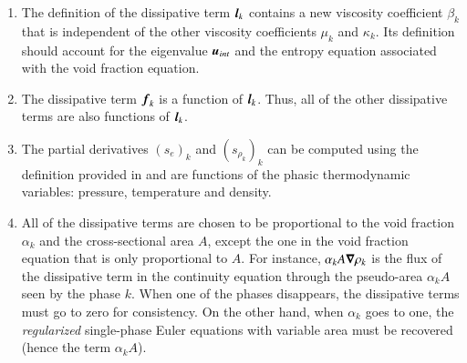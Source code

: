 \documentclass[preprint,10pt]{elsarticle}
\begin{document}
\begin{enumerate}
\item {The definition of the dissipative term $\boldsymbol l_k$ contains a new viscosity
    coefficient $\beta_k$ that is independent of
    the other viscosity coefficients $\mu_k$ and $\kappa_k$. Its definition should
    account for the eigenvalue $\boldsymbol u_{int}$ and  the entropy equation associated with the void fraction equation.}

\item {The dissipative term $\boldsymbol f_k$ is a function of $\boldsymbol l_k$. Thus, all of the other
    dissipative terms are also functions of $\boldsymbol l_k$.}

\item {The partial derivatives $(s_e)_k$ and $(s_{\rho_k})_k$ can be computed using the
    definition provided in  and are functions of the phasic thermodynamic
    variables: pressure, temperature and density.}

\item {All of the dissipative terms are chosen to be proportional to the void
    fraction $\alpha_k$ and the cross-sectional area $A$, except the one in the void fraction equation that is only proportional to $A$. For instance, $\alpha_k A \boldsymbol\nabla \rho_k$ is the
    flux of the dissipative term in the continuity equation through the pseudo-area $\alpha_k A$ seen
    by the phase $k$. When one of the phases disappears, the dissipative terms
    must go to zero for consistency. On the other hand, when $\alpha_k$ goes to one,
    the \emph{regularized} single-phase Euler equations with variable area must be recovered (hence the term $\alpha_k A$). }    


\end{enumerate}
\end{document}
